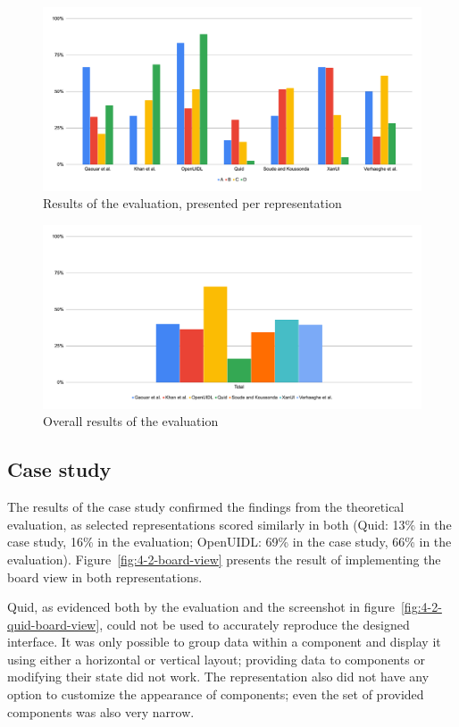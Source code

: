 \begin{figure}
    \centering
    \includegraphics[width=\textwidth]{4-results-and-discussion/results-per-representation}
    \caption{Results of the evaluation, presented per representation}
    \label{fig:4-2-results-per-representation}
\end{figure}

\begin{figure}
    \centering
    \includegraphics[width=\textwidth]{4-results-and-discussion/results-total}
    \caption{Overall results of the evaluation}
    \label{fig:4-2-results-total}
\end{figure}

\subsection{Case study}\label{subsec:case-study}
The results of the case study confirmed the findings from the theoretical evaluation, as selected representations scored similarly in both (Quid: 13\% in the case study, 16\% in the evaluation; OpenUIDL: 69\% in the case study, 66\% in the evaluation).
Figure~\ref{fig:4-2-board-view} presents the result of implementing the board view in both representations.

Quid, as evidenced both by the evaluation and the screenshot in figure~\ref{fig:4-2-quid-board-view}, could not be used to accurately reproduce the designed interface.
It was only possible to group data within a component and display it using either a horizontal or vertical layout; providing data to components or modifying their state did not work.
The representation also did not have any option to customize the appearance of components; even the set of provided components was also very narrow.

